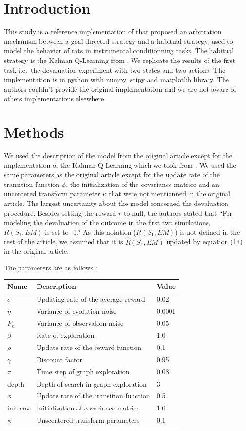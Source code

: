 \documentclass[10pt,a4paper,onecolumn]{article}
\begin{document}
\section{Introduction}\label{introduction}

This study is a reference implementation of \textcite{keramati} that
proposed an arbitration mechanism between a goal-directed strategy and a
habitual strategy, used to model the behavior of rats in instrumental
conditionning tasks. The habitual strategy is the Kalman Q-Learning from
\textcite{geist}. We replicate the results of the first task i.e.~the
devaluation experiment with two states and two actions. The
implementation is in python with numpy, scipy and matplotlib library.
The authors couldn't provide the original implementation and we are not
aware of others implementations elsewhere.

\section{Methods}\label{methods}

We used the description of the model from the original article except
for the implementation of the Kalman Q-Learning which we took from
\textcite{geist}. We used the same parameters as the original article
except for the update rate of the transition function \(\phi\), the
initialization of the covariance matrice and an uncentered transform
parameter \(\kappa\) that were not mentionned in the original article.
The largest uncertainty about the model concerned the devaluation
procedure. Besides setting the reward \(r\) to null, the authors stated
that ``For modeling the devaluation of the outcome in the first two
simulations, \(R(S_1, EM)\) is set to -1.'' As this notation
(\(R(S_1, EM)\)) is not defined in the rest of the article, we assumed
that it is \(\hat{R}(S_1, EM)\) updated by equation (14) in the original
article.

The parameters are as follows :

\begin{longtable}[c]{@{}lll@{}}
\toprule
Name & Description & Value\tabularnewline
\midrule
\endhead
\(\sigma\) & Updating rate of the average reward & 0.02\tabularnewline
\(\eta\) & Variance of evolution noise & 0.0001\tabularnewline
\(P_n\) & Variance of observation noise & 0.05\tabularnewline
\(\beta\) & Rate of exploration & 1.0\tabularnewline
\(\rho\) & Update rate of the reward function & 0.1\tabularnewline
\(\gamma\) & Discount factor & 0.95\tabularnewline
\(\tau\) & Time step of graph exploration & 0.08\tabularnewline
depth & Depth of search in graph exploration & 3\tabularnewline
\(\phi\) & Update rate of the transition function & 0.5\tabularnewline
init cov & Initialisation of covariance matrice & 1.0\tabularnewline
\(\kappa\) & Unscentered transform parameters & 0.1\tabularnewline
\bottomrule
\end{longtable}
\end{document}
